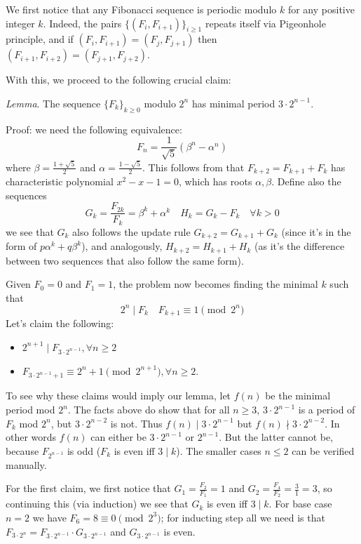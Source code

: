 \documentclass[11pt]{article}
\newcommand{\<}{\langle}
\renewcommand{\>}{\rangle}
\begin{document}
\begin{enumerate}
	We first notice that any Fibonacci sequence is periodic modulo $k$ for any positive integer $k$. Indeed, the pairs $\{(F_i, F_{i+1})\}_{i\ge 1}$ repeats itself via Pigeonhole principle, and if $(F_i, F_{i+1})=(F_j, F_{j+1})$ then $(F_{i+1}, F_{i+2})=(F_{j+1}, F_{j+2})$. 
	
	With this, we proceed to the following crucial claim: 
	
	\emph{Lemma}. The sequence $\{F_k\}_{k\ge 0}$ modulo $2^n$ has minimal period $3\cdot 2^{n-1}$. 
	
	Proof: we need the following equivalence: 
	\[
	F_n=\frac{1}{\sqrt{5}}(\beta^n-\alpha^n)
	\]
	where $\beta=\frac{1+\sqrt{5}}{2}$ and $\alpha=\frac{1-\sqrt{5}}{2}$. 
	This follows from that $F_{k+2}=F_{k+1}+F_k$ has characteristic polynomial $x^2-x-1=0$, which has roots $\alpha, \beta$. 
	Define also the sequences
	\[
	G_k = \frac{F_{2k}}{F_k}=\beta^k+\alpha^k \quad H_k = G_k-F_k\quad \forall k>0
	\]
	we see that $G_k$ also follows the update rule $G_{k+2}=G_{k+1}+G_k$ 
	(since it's in the form of $p\alpha^k+q\beta^k$), 
	and analogously, $H_{k+2}=H_{k+1}+H_k$ (as it's the difference between two sequences that also follow the same form). 
	
	Given $F_0=0$ and $F_1=1$, the problem now becomes finding the minimal $k$ such that 
	\[
	2^n\mid F_k\quad F_{k+1}\equiv 1\pmod{2^n}
	\]
	Let's claim the following: 
	\begin{itemize}
		\item $2^{n+1}\mid F_{3\cdot 2^{n-1}}, \forall n\ge 2$
		\item $F_{3\cdot 2^{n-1}+1}\equiv 2^n+1\pmod{2^{n+1}}, \forall n\ge 2$.  
	\end{itemize}
    To see why these claims would imply our lemma, let $f(n)$ be the minimal period mod $2^n$. 
    The facts above do show that for all $n\ge 3$, $3\cdot 2^{n-1}$ is a period of $F_k$ mod $2^n$, but $3\cdot 2^{n-2}$ is not. 
    Thus $f(n)\mid 3\cdot 2^{n-1}$ but $f(n)\nmid 3\cdot 2^{n-2}$. In other words $f(n)$ can either be $3\cdot 2^{n-1}$ or $2^{n-1}$. But the latter cannot be, because $F_{2^{n-1}}$ is odd ($F_k$ is even iff $3\mid k$). 
    The smaller cases $n\le 2$ can be verified manually. 
    
    For the first claim, 
	we first notice that $G_1=\frac{F_2}{F_1}=1$ and $G_2=\frac{F_4}{F_2}=\frac{3}{1}=3$, so continuing this (via induction) we see that $G_k$ is even iff $3\mid k$. 
	For base case $n=2$ we have $F_6=8\equiv 0\pmod{2^3}$; 
	for inducting step all we need is that $F_{3\cdot 2^{n}}=F_{3\cdot 2^{n-1}}\cdot G_{3\cdot 2^{n-1}}$
	and $G_{3\cdot 2^{n-1}}$ is even. 
	

\end{enumerate}
\end{document}
